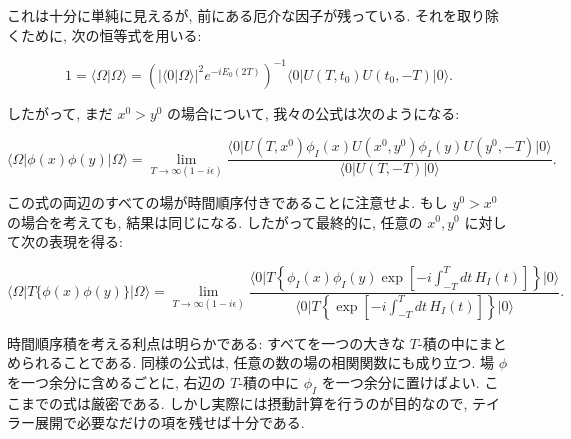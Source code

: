 \documentclass[a4paper,12pt]{article}
\begin{document}
これは十分に単純に見えるが, 前にある厄介な因子が残っている. 
それを取り除くために, 次の恒等式を用いる:

\begin{equation*}
1 = \langle \Omega | \Omega \rangle 
= \left( \lvert \langle 0 | \Omega \rangle \rvert^2 e^{-iE_0 (2T)} \right)^{-1} 
\langle 0 \lvert U(T,t_0)U(t_0,-T)\lvert 0 \rangle .
\end{equation*}

したがって, まだ $x^0 > y^0$ の場合について, 我々の公式は次のようになる:

\begin{equation*}
\langle \Omega \lvert \phi(x)\phi(y) \lvert \Omega \rangle 
= \lim_{T \to \infty (1-i\epsilon)} 
\frac{ \langle 0 \lvert U(T,x^0)\phi_I(x)U(x^0,y^0)\phi_I(y)U(y^0,-T)\lvert 0 \rangle }
{ \langle 0 \lvert U(T,-T)\lvert 0 \rangle } .
\end{equation*}

この式の両辺のすべての場が時間順序付きであることに注意せよ. 
もし $y^0 > x^0$ の場合を考えても, 結果は同じになる. 
したがって最終的に, 任意の $x^0, y^0$ に対して次の表現を得る:

\begin{equation*}
\langle \Omega \lvert T\{\phi(x)\phi(y)\} \lvert \Omega \rangle
= \lim_{T \to \infty (1-i\epsilon)}
\frac{ \langle 0 \lvert T \left\{ \phi_I(x)\phi_I(y)\exp\left[ -i \int_{-T}^T dt \, H_I(t)\right]\right\} \lvert 0 \rangle }
{ \langle 0 \lvert T \left\{\exp\left[ -i \int_{-T}^T dt \, H_I(t)\right]\right\} \lvert 0 \rangle } .
\tag{4.31}
\end{equation*}

時間順序積を考える利点は明らかである: 
すべてを一つの大きな $T$-積の中にまとめられることである. 
同様の公式は, 任意の数の場の相関関数にも成り立つ. 
場 $\phi$ を一つ余分に含めるごとに, 右辺の $T$-積の中に $\phi_I$ を一つ余分に置けばよい. 
ここまでの式は厳密である. 
しかし実際には摂動計算を行うのが目的なので, 
テイラー展開で必要なだけの項を残せば十分である.

    
\end{document}
